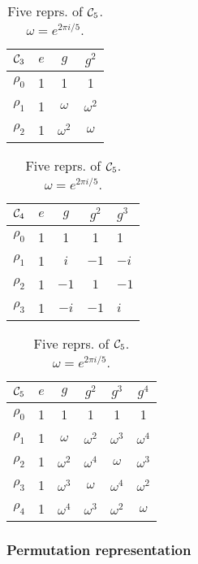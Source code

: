 \begin{table}[hbt!]
	\parbox[s]{.31\linewidth}{
		\centering
		\begin{tabular}{c | c c c}
			$\Cyc_3$ & $e$ & $g$        & $g^2$      \\ \hline
			$\rho_0$          & 1   & 1          & 1          \\
			$\rho_1$          & 1   & $\omega$   & $\omega^2$ \\
			$\rho_2$          & 1   & $\omega^2$ & $\omega$
		\end{tabular}
		\vfill
		\caption{Three reprs. of $\Cyc_3$. $\omega = e^{2 \pi i/3}$.}
		\label{table:Cyc3}
	}
	\hfill
	\parbox[s]{.31\linewidth}{
		\centering
		\begin{tabular}{c | c c cl}
			$\Cyc_4$ & $e$ & $g$  & $g^2$ & $g^3$ \\ \hline
			$\rho_0$           & 1   & 1    & 1     & 1     \\
			$\rho_1$           & 1   & $i$  & $-1$  & $-i$  \\
			$\rho_2$           & 1   & $-1$ & $1$  & $-1$   \\
			$\rho_3$           & 1   & $-i$ & $-1$   & $i$
		\end{tabular}
		\caption{Four reprs. of $\Cyc_4$.}
		\label{tbl:cyc4}
	}
	\hfill
	\parbox[s]{.33\linewidth}{
		\centering
		\begin{tabular}{c | c c c c c}
			$\mathcal{C}_5$ & $e$ & $g$        & $g^2$      & $g^3$      & $g^4$      \\ \hline
			$\rho_0$            & 1   & 1          & 1          & 1          & 1          \\
			$\rho_1$            & 1   & $\omega$ & $\omega^2$ & $\omega^3$ & $\omega^4$ \\
			$\rho_2$            & 1   & $\omega^2$ & $\omega^4$ & $\omega$ & $\omega^3$ \\
			$\rho_3$            & 1   & $\omega^3$ & $\omega$ & $\omega^4$ & $\omega^2$ \\
			$\rho_4$            & 1   & $\omega^4$ & $\omega^3$ & $\omega^2$ & $\omega$
		\end{tabular}
		\caption{Five reprs. of $\mathcal{C}_5$. $\omega = e^{2 \pi i/5}$.}
		\label{table:Cyc5}
	}
\end{table}



\subsubsection{Permutation representation}

